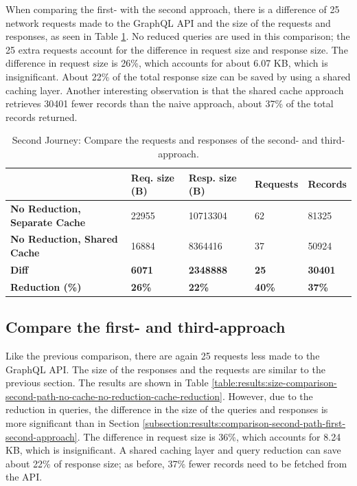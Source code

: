 When comparing the first- with the second approach, there is a difference of 25 network requests made to the GraphQL \ac{API} and the size of the requests and responses, as seen in Table \ref{table:results:size-comparison-second-path-cache-no-reduction-cache-reduction}. No reduced queries are used in this comparison; the 25 extra requests account for the difference in request size and response size. The difference in request size is 26\%, which accounts for about 6.07 KB, which is insignificant. About 22\% of the total response size can be saved by using a shared caching layer. Another interesting observation is that the shared cache approach retrieves 30401 fewer records than the naive approach, about 37\% of the total records returned.

\ifshowTables
\begin{table}[H]
  \begin{tabular}{|l|l|l|l|l|}
  \hline
  & \textbf{Req. size (B)} & \textbf{Resp. size (B)} & \textbf{Requests} & \textbf{Records} \\
  \hline
  \textbf{No Reduction, Separate Cache} & 22955 & 10713304 & 62 & 81325 \\
  \hline
  \textbf{No Reduction, Shared Cache} & 16884 & 8364416 & 37 & 50924 \\
  \hline
  \hline
  \textbf{Diff} & \textbf{6071} & \textbf{2348888} & \textbf{25} & \textbf{30401} \\
  \hline
  \textbf{Reduction (\%)} & \textbf{26\%} & \textbf{22\%} & \textbf{40\%} & \textbf{37\%} \\
  \hline
  \end{tabular}
  \caption{Second Journey: Compare the requests and responses of the second- and third-approach.}\label{table:results:size-comparison-second-path-cache-no-reduction-cache-reduction}
\end{table}
\fi

\subsection{Compare the first- and third-approach}\label{subsection:results:comparison-second-path-second-third-approach}

Like the previous comparison, there are again 25 requests less made to the GraphQL \ac{API}. The size of the responses and the requests are similar to the previous section. The results are shown in Table \ref{table:results:size-comparison-second-path-no-cache-no-reduction-cache-reduction}. However, due to the reduction in queries, the difference in the size of the queries and responses is more significant than in Section \ref{subsection:results:comparison-second-path-first-second-approach}. The difference in request size is 36\%, which accounts for 8.24 KB, which is insignificant. A shared caching layer and query reduction can save about 22\% of response size; as before, 37\% fewer records need to be fetched from the \ac{API}.

